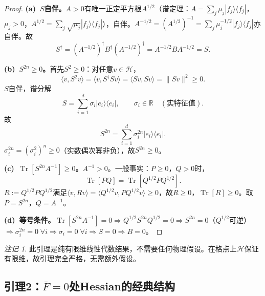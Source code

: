 \documentclass[12pt,a4paper]{article}
\theoremstyle{plain}
\theoremstyle{definition}
\theoremstyle{remark}
\newtheorem{remark}[theorem]{注记}
\begin{document}
\begin{proof}
\textbf{(a)~$S$自伴。}$A>0$有唯一正定平方根$A^{1/2}$（谱定理：$A=\sum_j\mu_j|f_j\rangle\langle f_j|$，$\mu_j>0$，$A^{1/2}=\sum_j\sqrt{\mu_j}|f_j\rangle\langle f_j|$），自伴。$A^{-1/2}=(A^{1/2})^{-1}=\sum_j\mu_j^{-1/2}|f_j\rangle\langle f_j|$亦自伴。故
\begin{equation}
S^\dagger = (A^{-1/2})^\dagger B^\dagger (A^{-1/2})^\dagger = A^{-1/2}BA^{-1/2} = S.
\end{equation}

\textbf{(b)~$S^{2n}\geq 0$。}首先$S^2\geq 0$：对任意$v\in\mathcal{H}$，
\begin{equation}\label{eq:S2psd}
\langle v,S^2v\rangle = \langle v,S^\dagger Sv\rangle = \langle Sv,Sv\rangle = \|Sv\|^2 \geq 0.
\end{equation}
$S$自伴，谱分解
\begin{equation}\label{eq:Sspectral}
S=\sum_{i=1}^d\sigma_i|e_i\rangle\langle e_i|, \qquad \sigma_i\in\mathbb{R}\quad(\text{实特征值}).
\end{equation}
故
\begin{equation}\label{eq:S2n}
S^{2n} = \sum_{i=1}^d \sigma_i^{2n}|e_i\rangle\langle e_i|.
\end{equation}
$\sigma_i^{2n}=(\sigma_i^2)^n\geq 0$（实数偶次幂非负），故$S^{2n}\geq 0$。

\textbf{(c)~$\operatorname{Tr}[S^{2n}A^{-1}]\geq 0$。}$A^{-1}>0$。一般事实：$P\geq 0$，$Q>0$时，
\begin{equation}\label{eq:TrPQ}
\operatorname{Tr}[PQ] = \operatorname{Tr}[Q^{1/2}PQ^{1/2}].
\end{equation}
$R:=Q^{1/2}PQ^{1/2}$满足$\langle v,Rv\rangle=\langle Q^{1/2}v,PQ^{1/2}v\rangle\geq 0$，故$R\geq 0$，$\operatorname{Tr}[R]\geq 0$。取$P=S^{2n}$，$Q=A^{-1}$。

\textbf{(d)~等号条件。}$\operatorname{Tr}[S^{2n}A^{-1}]=0\Rightarrow Q^{1/2}S^{2n}Q^{1/2}=0\Rightarrow S^{2n}=0$（$Q^{1/2}$可逆）$\Rightarrow\sigma_i^{2n}=0\;\forall i\Rightarrow\sigma_i=0\;\forall i\Rightarrow S=0\Rightarrow B=0$。
\end{proof}

\begin{remark}
此引理是纯有限维线性代数结果，不需要任何物理假设。在格点上$\mathcal{H}$保证有限维，故引理完全严格，无需额外假设。
\end{remark}

\subsection{引理2：$\bar{F}=0$处Hessian的经典结构}\label{sec:lemma2}
\end{document}
